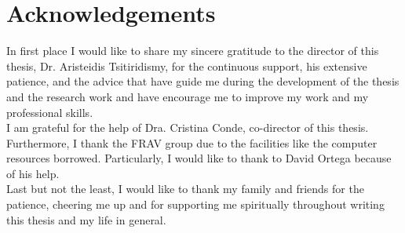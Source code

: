 \chapter*{Acknowledgements} %
In first place I would like to share my sincere gratitude to the director of this thesis, Dr. Aristeidis Tsitiridismy, for the continuous support, his extensive patience, and the advice that have guide me during the development of the thesis and the research work and have encourage me to improve my work and my professional skills.\\

I am grateful for the help of Dra. Cristina Conde, co-director of this thesis. Furthermore, I thank the FRAV group due to the facilities like the computer resources borrowed. Particularly, I would like to thank to David Ortega because of his help.\\

Last but not the least, I would like to thank my family and friends for the patience, cheering me up and for supporting me spiritually throughout writing this thesis and my life in general.\\

